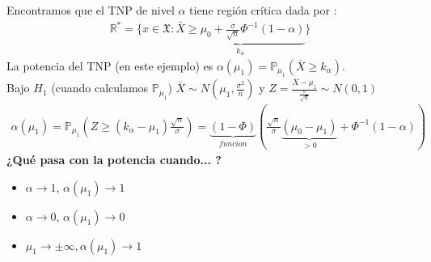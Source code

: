\documentclass[10pt]{article}
\theoremstyle{plain}
\theoremstyle{definition}
\begin{document}
Encontramos que el TNP de nivel $\alpha$ tiene región crítica dada por :
\begin{align*}
\mathbb{R}^* = \{x\in \mathfrak{X}\colon \underbrace{\bar{X}\ge \mu_{0}+ \frac{\sigma}{\sqrt{n}}\Phi^{-1}(1-\alpha)}_{k_{\alpha}}\}
\end{align*}
La potencia del TNP (en este ejemplo) es $\alpha(\mu_{1}) = \mathbb{P}_{\mu_{1}}(\bar{X}\ge k_{\alpha})$.\\
Bajo $H_{1}$ (cuando calculamos $\mathbb{P}_{\mu_{1}}$) $\bar{X} \sim N(\mu_{1},\frac{\sigma^2}{n})$ y $Z = \frac{\bar{X}-\mu_{1}}{\frac{\sigma}{\sqrt{n}}} \sim N(0,1)$ 
\begin{align*}
\alpha(\mu_{1}) = \mathbb{P}_{\mu_{1}}\left(Z \ge (k_{\alpha}-\mu_{1})\frac{\sqrt{n}}{\sigma}\right) = \underbrace{(1-\Phi)}_{funcion}\left(\frac{\sqrt{n}}{\sigma}\underbrace{(\mu_{0}-\mu_{1})}_{>0}+\Phi^{-1}(1-\alpha)\right)
\end{align*}
\textbf{¿Qué pasa con la potencia cuando... ?}
\begin{itemize}
\item $\alpha \rightarrow 1$, $\alpha(\mu_{1}) \rightarrow 1$
\item $\alpha \rightarrow 0$, $\alpha(\mu_{1}) \rightarrow 0$
\item $\mu_{1} \rightarrow \pm\infty, \alpha(\mu_{1}) \rightarrow 1$
\end{itemize}
\end{document}
